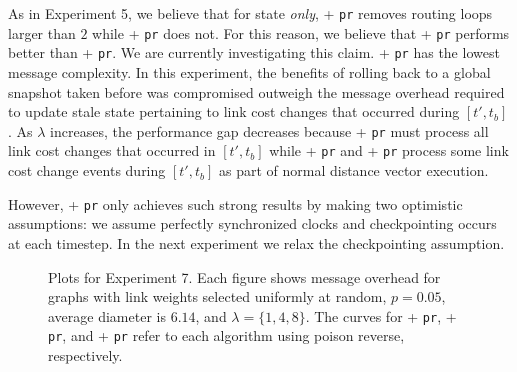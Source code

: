 As in Experiment 5, we believe that for \badvector state \emph{only}, \purge + {\tt pr} removes routing loops larger than $2$ while \second + {\tt pr} does not. 
For this reason, we believe that \purge + {\tt pr} performs better than \second + {\tt pr}.  We are currently investigating this claim.
\cpr + {\tt pr} has the lowest message complexity. %
In this experiment, the benefits of rolling back to a global snapshot taken before \bad was compromised outweigh the message overhead required to update stale state pertaining to 
link cost changes that occurred during $[t',t_b]$. As $\lambda$ increases,
the performance gap decreases because \cpr + {\tt pr} must process all link cost changes that occurred in $[t',t_b]$ while \second + {\tt pr}  and \purge + {\tt pr}
process some link cost change events during $[t',t_b]$ as part of normal distance vector execution.

However, \cpr + {\tt pr} only achieves such strong results by making two optimistic assumptions:  we assume perfectly synchronized clocks and checkpointing occurs at each timestep.
In the next experiment we relax the checkpointing assumption.


\begin{figure*}[t]
\centering
{}
\caption{Plots for Experiment 7. Each figure shows message overhead for \er graphs with link weights selected uniformly at random, $p=0.05$, average diameter is $6.14$, and $\lambda=\{1,4,8\}$.
The curves for \second + {\tt pr}, \purge + {\tt pr}, and \cpr + {\tt pr} refer to each algorithm using poison reverse, respectively.
} 
\label{fig:prlc}
\end{figure*}


